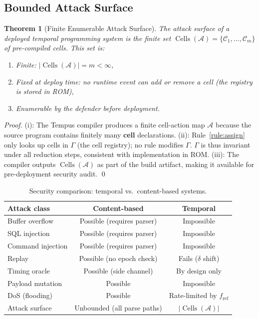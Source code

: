 \documentclass[twocolumn,10pt]{article}
\newtheorem{theorem}{Theorem}[section]
\newcommand{\fref}{f_{\mathrm{ref}}}
\newcommand{\calC}{\mathcal{C}}     %
\DeclareMathOperator{\Cells}{Cells}
\begin{document}
\subsection{Bounded Attack Surface}

\begin{theorem}[Finite Enumerable Attack Surface]
\label{thm:surface}
The attack surface of a deployed temporal programming system is the
finite set $\Cells(\mathcal{A}) = \{\calC_1, \ldots, \calC_m\}$ of
pre-compiled cells. This set is:
\begin{enumerate}[leftmargin=1.5em,topsep=2pt,itemsep=1pt]
  \item[(i)] \emph{Finite}: $|\Cells(\mathcal{A})| = m < \infty$,
  \item[(ii)] \emph{Fixed at deploy time}: no runtime event can add
    or remove a cell (the registry is stored in ROM),
  \item[(iii)] \emph{Enumerable by the defender} before deployment.
\end{enumerate}
\end{theorem}
\begin{proof}
(i): The Tempus compiler produces a finite cell-action map $\mathcal{A}$
because the source program contains finitely many \textbf{cell}
declarations. (ii): Rule~\eqref{rule:assign} only looks up cells in
$\Gamma$ (the cell registry); no rule modifies $\Gamma$. $\Gamma$
is thus invariant under all reduction steps, consistent with
implementation in ROM. (iii): The compiler outputs $\Cells(\mathcal{A})$
as part of the build artifact, making it available for pre-deployment
security audit. \qed
\end{proof}

\begin{table}[ht]
\centering
\caption{Security comparison: temporal vs.\ content-based systems.}
\label{tab:security}
\small
\begin{tabular}{@{}lcc@{}}
\toprule
\textbf{Attack class} & \textbf{Content-based} & \textbf{Temporal} \\
\midrule
Buffer overflow     & Possible (requires parser)  & Impossible \\
SQL injection       & Possible (requires parser)  & Impossible \\
Command injection   & Possible (requires parser)  & Impossible \\
Replay              & Possible (no epoch check)   & Fails ($\delta$ shift) \\
Timing oracle       & Possible (side channel)     & By design only \\
Payload mutation    & Possible                    & Impossible \\
DoS (flooding)      & Possible                    & Rate-limited by $\fref$ \\
Attack surface      & Unbounded (all parse paths) & $|\Cells(\mathcal{A})|$ \\
\bottomrule
\end{tabular}
\end{table}
\end{document}
